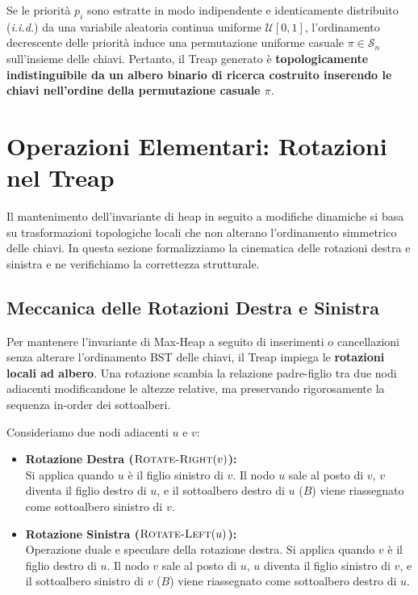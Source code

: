 \begin{property}
Se le priorit\`a $p_i$ sono estratte in modo indipendente e identicamente distribuito (\textit{i.i.d.}) da una variabile aleatoria continua uniforme $\mathcal{U}[0, 1]$, l'ordinamento decrescente delle priorit\`a induce una permutazione uniforme casuale $\pi \in \mathcal{S}_n$ sull'insieme delle chiavi. Pertanto, il Treap generato \`e \textbf{topologicamente indistinguibile da un albero binario di ricerca costruito inserendo le chiavi nell'ordine della permutazione casuale $\pi$}.
\end{property}

\FloatBarrier
\section{Operazioni Elementari: Rotazioni nel Treap}
\label{sec:tree-rotations}

Il mantenimento dell'invariante di heap in seguito a modifiche dinamiche si basa su trasformazioni topologiche locali che non alterano l'ordinamento simmetrico delle chiavi. In questa sezione formalizziamo la cinematica delle rotazioni destra e sinistra e ne verifichiamo la correttezza strutturale.

\FloatBarrier
\subsection{Meccanica delle Rotazioni Destra e Sinistra}
Per mantenere l'invariante di Max-Heap a seguito di inserimenti o cancellazioni senza alterare l'ordinamento BST delle chiavi, il Treap impiega le \textbf{rotazioni locali ad albero}. Una rotazione scambia la relazione padre-figlio tra due nodi adiacenti modificandone le altezze relative, ma preservando rigorosamente la sequenza in-order dei sottoalberi.

Consideriamo due nodi adiacenti $u$ e $v$:
\begin{itemize}
    \item \textbf{Rotazione Destra ($\textsc{Rotate-Right}(v)$):}\\
    Si applica quando $u$ \`e il figlio sinistro di $v$. Il nodo $u$ sale al posto di $v$, $v$ diventa il figlio destro di $u$, e il sottoalbero destro di $u$ ($B$) viene riassegnato come sottoalbero sinistro di $v$.
    
    \item \textbf{Rotazione Sinistra ($\textsc{Rotate-Left}(u)$):}\\
    Operazione duale e speculare della rotazione destra. Si applica quando $v$ \`e il figlio destro di $u$. Il nodo $v$ sale al posto di $u$, $u$ diventa il figlio sinistro di $v$, e il sottoalbero sinistro di $v$ ($B$) viene riassegnato come sottoalbero destro di $u$.
\end{itemize}

